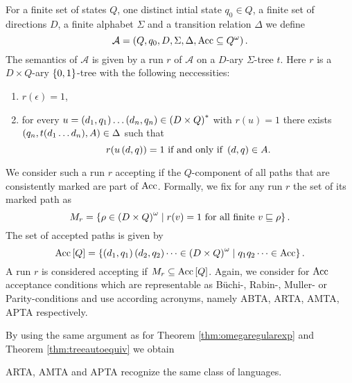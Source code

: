 \begin{definition}
  For a finite set of states $Q$, one distinct intial state $q_{0}\in Q$, a
  finite set of directions $D$, a finite alphabet $\Sigma$ and a transition
  relation $\Delta$ we define 
  \begin{equation*}
    \mathcal{A} = \left(Q, q_{0}, D, \Sigma, \Delta, \operatorname{Acc}\subseteq Q^{\omega}\right).
  \end{equation*}
  The semantics of $\mathcal{A}$ is given by a run $r$ of $\mathcal{A}$ on a
  $D$-ary $\Sigma$-tree $t$. Here $r$ is a $D\times Q$-ary $\left\{0,1\right\}$-tree 
  with the following neccessities:
  \begin{enumerate}
    \item $r(\epsilon) = 1$,
    \item for every $u = \left(d_{1}, q_{1}\right)\dots\left(d_{n}, q_{n}\right)\in
      \left(D\times Q\right)^{*}$ with $r(u) = 1$ there exists
      $\left(q_{n}, t(d_{1}\dots d_{n}), A\right)\in\Delta$ such that
      \begin{equation*}
        r(u\left(d, q\right)) = 1\text{ if and only if }\left(d, q\right)\in A.
      \end{equation*}
  \end{enumerate}
  We consider such a run $r$ accepting if the $Q$-component of all paths that 
  are consistently marked are part of $\operatorname{Acc}$. Formally, we fix for any run $r$ 
  the set of its marked path as
  \begin{equation*}
    M_{r} = \left\{
      \rho\in\left(D\times Q\right)^{\omega}\mid r(v) = 1\text{ for all finite }
        v\sqsubseteq\rho
    \right\}.
  \end{equation*}
  The set of accepted paths is given by
  \begin{equation*}
    \operatorname{Acc}\left[Q\right] = \left\{
      \left(d_{1}, q_{1}\right)\left(d_{2}, q_{2}\right)\dots\in
      \left(D\times Q\right)^{\omega}\mid q_{1}q_{2}\dots\in\operatorname{Acc}
    \right\}.
  \end{equation*}
  A run $r$ is considered accepting if $M_{r}\subseteq\operatorname{Acc}\left[Q\right]$.
  Again, we consider for $\operatorname{Acc}$ acceptance conditions which are representable
  as Büchi-, Rabin-, Muller- or Parity-conditions and use according acronyms,
  namely \acs{ABTA}, \acs{ARTA}, \acs{AMTA}, \acs{APTA} respectively.
      
\end{definition}
By using the same argument as for Theorem 
\ref{thm:omegaregularexp} and Theorem \ref{thm:treeautoequiv} we obtain
\begin{theorem}
  \ac{ARTA}, \ac{AMTA} and \ac{APTA} recognize the same class of languages.
  \label{thm:atreeautoequiv}
\end{theorem}
